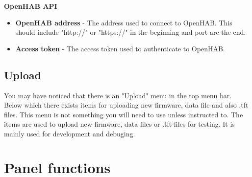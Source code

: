 \documentclass[10pt]{article}
\begin{document}
    \textbf{OpenHAB API}
    \begin{itemize}
      \item \textbf{OpenHAB address} - The address used to connect to OpenHAB. This should include "http://" or "https://" in the beginning and port are the end.
      \item \textbf{Access token} - The access token used to authenticate to OpenHAB.
    \end{itemize}

    \subsection{Upload}
    You may have noticed that there is an "Upload" menu in the top menu bar. Below which there exists items for uploading new firmware, data file and also .tft files. This menu is not something you
    will need to use unless instructed to. The items are used to upload new firmware, data files or .tft-files for testing. It is mainly used for development and debuging.

    \clearpage
    \section{Panel functions}
\end{document}
